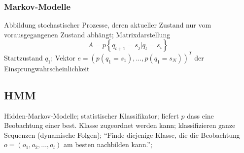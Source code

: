 \documentclass[german,color,6pt]{latex4ei/latex4ei_sheet}
\begin{document}
\begin{sectionbox}
\subsubsection{Markov-Modelle}
Abbildung stochastischer Prozesse, deren aktueller Zustand nur vom vorausgegangenen Zustand abhängt; Matrixdarstellung \begin{equation*}
A = p \left\{ q_{t+1} = s_j | q_t = s_i \right\}
\end{equation*}
Startzustand $q_1$; Vektor $e = (p(q_1 = s_1), \dots , p(q_1 = s_N))^T$ der Einsprungwahrscheinlichkeit
\end{sectionbox}

\subsection{HMM}

\begin{sectionbox}
Hidden-Markov-Modelle; statistischer Klassifikator; liefert $p$ dass eine Beobachtung einer best. Klasse zugeordnet werden kann; klassifizieren ganze Sequenzen (dynamische Folgen); "`Finde diejenige Klasse, die die Beobachtung $o=(o_1, o_2, \dots , o_t)$ am besten nachbilden kann."';  
\end{sectionbox}
\end{document}
